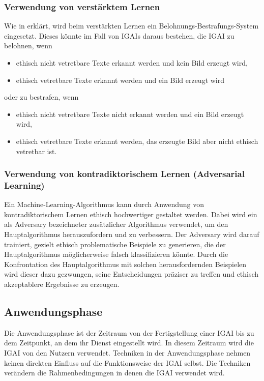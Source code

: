 \documentclass[12pt]{report}
\begin{document}
\subsubsection{Verwendung von verstärktem Lernen}
Wie in  erklärt, wird beim verstärkten Lernen ein Belohnungs-Bestrafungs-System eingesetzt. Dieses könnte im Fall von \ac{IGAI}s daraus bestehen, die \ac{IGAI} zu belohnen, wenn 
\begin{itemize}
    \item ethisch nicht vetretbare Texte erkannt werden und kein Bild erzeugt wird,
    \item ethisch vetretbare Texte erkannt werden und ein Bild erzeugt wird
\end{itemize}
oder zu bestrafen, wenn
\begin{itemize}
    \item ethisch nicht vetretbare Texte nicht erkannt werden und ein Bild erzeugt wird,
    \item ethisch vetretbare Texte erkannt werden, das erzeugte Bild aber nicht ethisch vetretbar ist.
\end{itemize}  

\subsubsection{Verwendung von kontradiktorischem Lernen (Adversarial Learning)}
Ein Machine-Learning-Algorithmus kann durch Anwendung von kontradiktorischem Lernen ethisch hochwertiger gestaltet werden. Dabei wird ein als Adversary bezeichneter zusätzlicher Algorithmus verwendet, um den Hauptalgorithmus herauszufordern und zu verbessern. \cite[S. 3]{Kurakin} Der Adversary wird darauf trainiert, gezielt ethisch problematische Beispiele zu generieren, die der Hauptalgorithmus möglicherweise falsch klassifizieren könnte. Durch die Konfrontation des Hauptalgorithmus mit solchen herausfordernden Beispielen wird dieser dazu gezwungen, seine Entscheidungen präziser zu treffen und ethisch akzeptablere Ergebnisse zu erzeugen.

\subsection{Anwendungsphase}

Die Anwendungsphase ist der Zeitraum von der Fertigstellung einer \ac{IGAI} bis zu dem Zeitpunkt, an dem ihr Dienst eingestellt wird. In diesem Zeitraum wird die \ac{IGAI} von den Nutzern verwendet. Techniken in der Anwendungsphase nehmen keinen direkten Einfluss auf die Funktionsweise der \ac{IGAI} selbst. Die Techniken verändern die Rahmenbedingungen in denen die \ac{IGAI} verwendet wird.
\end{document}
